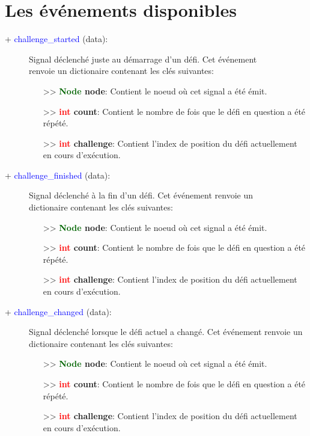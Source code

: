 \documentclass[a4paper, 11pt]{article}
\begin{document}
	\section{Les événements disponibles}
	\begin{description}
		\item [+ \textcolor{blue}{challenge\_started} (data):] Signal déclenché juste au démarrage d'un 
		défi. Cet événement \\renvoie un dictionaire contenant les clés suivantes:
		\begin{itemize}
			\item [>> \textbf{\textcolor{darkgreen}{Node} node}:] Contient le noeud où cet signal a été 
			émit.
			\item [>> \textbf{\textcolor{red}{int} count}:] Contient le nombre de fois que le défi en 
			question a été répété.
			\item [>> \textbf{\textcolor{red}{int} challenge}:] Contient l'index de position du défi 
			actuellement en cours d'exécution.\\
		\end{itemize}
	\end{description}
	\newpage \begin{description}
		\item [+ \textcolor{blue}{challenge\_finished} (data):] Signal déclenché à la fin d'un défi. Cet 
		événement renvoie un \\dictionaire contenant les clés suivantes:
		\begin{itemize}
			\item [>> \textbf{\textcolor{darkgreen}{Node} node}:] Contient le noeud où cet signal a été 
			émit.
			\item [>> \textbf{\textcolor{red}{int} count}:] Contient le nombre de fois que le défi en 
			question a été répété.
			\item [>> \textbf{\textcolor{red}{int} challenge}:] Contient l'index de position du défi 
			actuellement en cours d'exécution.\\
		\end{itemize}
	\end{description}
	\begin{description}
		\item [+ \textcolor{blue}{challenge\_changed} (data):] Signal déclenché lorsque le défi actuel a 
		changé. Cet événement renvoie un dictionaire contenant les clés suivantes:
		\begin{itemize}
			\item [>> \textbf{\textcolor{darkgreen}{Node} node}:] Contient le noeud où cet signal a été 
			émit.
			\item [>> \textbf{\textcolor{red}{int} count}:] Contient le nombre de fois que le défi en 
			question a été répété.
			\item [>> \textbf{\textcolor{red}{int} challenge}:] Contient l'index de position du défi 
			actuellement en cours d'exécution.\\
		\end{itemize}
	\end{description}
\end{document}

